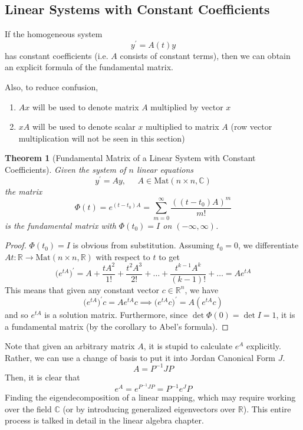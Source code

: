 \documentclass{article}
\newtheorem{theorem}{Theorem}[section]
\theoremstyle{remark}
\theoremstyle{definition}
\begin{document}
\subsection{Linear Systems with Constant Coefficients}
If the homogeneous system 
\[y^\prime = A(t) y\]
has constant coefficients (i.e. $A$ consists of constant terms), then we can obtain an explicit formula of the fundamental matrix. 

Also, to reduce confusion, 
\begin{enumerate}
    \item $Ax$ will be used to denote matrix $A$ multiplied by vector $x$
    \item $xA$ will be used to denote scalar $x$ multiplied to matrix $A$ (row vector multiplication will not be seen in this section)
\end{enumerate}

\begin{theorem}[Fundamental Matrix of a Linear System with Constant Coefficients]
Given the system of $n$ linear equations 
\[y^\prime = A y, \;\;\;\;\; A \in \text{Mat}(n \times n, \mathbb{C})\]
the matrix
\[\Phi(t) = e^{(t-t_0)A} = \sum_{m=0}^\infty \frac{((t-t_0)A)^m}{m!}\]
is the fundamental matrix with $\Phi(t_0) = I$ on $(-\infty, \infty)$. 
\end{theorem}
\begin{proof}
$\Phi(t_0) = I$ is obvious from substitution. Assuming $t_0 = 0$, we differentiate $At: \mathbb{R} \longrightarrow \text{Mat}(n \times n, \mathbb{R})$ with respect to $t$ to get
\[\big( e^{tA} \big)^\prime = A + \frac{tA^2} {1!} + \frac{t^2 A^3}{2!} + \ldots + \frac{t^{k-1} A^{k}}{(k-1)!} + \ldots = A e^{tA}\]
This means that given any constant vector $c \in \mathbb{R}^n$, we have
\[\big( e^{tA} \big)^\prime c = A e^{tA} c \implies \big( e^{tA} c\big)^\prime = A (e^{tA} c)\]
and so $e^{tA}$ is a solution matrix. Furthermore, since $\det{ \Phi(0)} = \det{I} = 1$, it is a fundamental matrix (by the corollary to Abel's formula). 
\end{proof}

Note that given an arbitrary matrix $A$, it is stupid to calculate $e^{A}$ explicitly. Rather, we can use a change of basis to put it into Jordan Canonical Form $J$. 
\[A = P^{-1} J P\]
Then, it is clear that
\[e^A = e^{P^{-1} J P} = P^{-1} e^J P\]
Finding the eigendecomposition of a linear mapping, which may require working over the field $\mathbb{C}$ (or by introducing generalized eigenvectors over $\mathbb{R}$). This entire process is talked in detail in the linear algebra chapter. 
\end{document}
